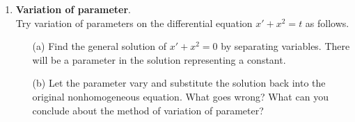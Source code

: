\documentclass[12pt]{amsart}
\begin{document}
\begin{enumerate}[1.]
  \item \textbf{Variation of parameter}.\\
    Try variation of parameters on the differential equation $x' + x^2
    = t$ as follows.
    \begin{enumerate}
      \item[(a)] Find the general solution of $x' + x^2 = 0$ by
        separating variables. There will be a parameter in the
        solution representing a constant.
        \item[(b)] Let the parameter vary and substitute the solution
          back into the original nonhomogeneous equation. What
            goes wrong?  What can you conclude about the method of
            variation of parameter?
    \end{enumerate}
  
      
    
\end{enumerate}

\bigskip

\end{document}
